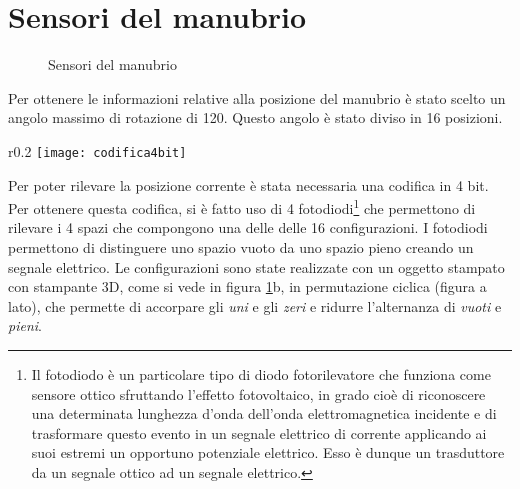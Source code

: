 \section{Sensori del manubrio}
\begin{figure}%
    \centering
    \caption{Sensori del manubrio}%
    \label{manubrio}
\end{figure}
Per ottenere le informazioni relative alla posizione del manubrio è stato scelto un angolo massimo di rotazione di 120\degree. Questo angolo è stato diviso in 16 posizioni. \\
\begin{wrapfigure}{r}{0.2\textwidth} %
    \centering
    \vspace{-1.5cm}
    \texttt{[image: codifica4bit]}
\end{wrapfigure}
Per poter rilevare la posizione corrente è stata necessaria una codifica in 4 bit. Per ottenere questa codifica, si è fatto uso di 4 fotodiodi\footnote{Il fotodiodo è un particolare tipo di diodo fotorilevatore che funziona come sensore ottico sfruttando l'effetto fotovoltaico, in grado cioè di riconoscere una determinata lunghezza d'onda dell'onda elettromagnetica incidente e di trasformare questo evento in un segnale elettrico di corrente applicando ai suoi estremi un opportuno potenziale elettrico. Esso è dunque un trasduttore da un segnale ottico ad un segnale elettrico.} che permettono di rilevare i 4 spazi che compongono una delle delle 16 configurazioni. I fotodiodi permettono di distinguere uno spazio vuoto da uno spazio pieno creando un segnale elettrico. Le configurazioni sono state realizzate con un oggetto stampato con stampante 3D, come si vede in figura \ref{manubrio}b, in permutazione ciclica (figura a lato), che permette di accorpare gli \textit{uni} e gli \textit{zeri} e ridurre l'alternanza di \textit{vuoti} e \textit{pieni}.


